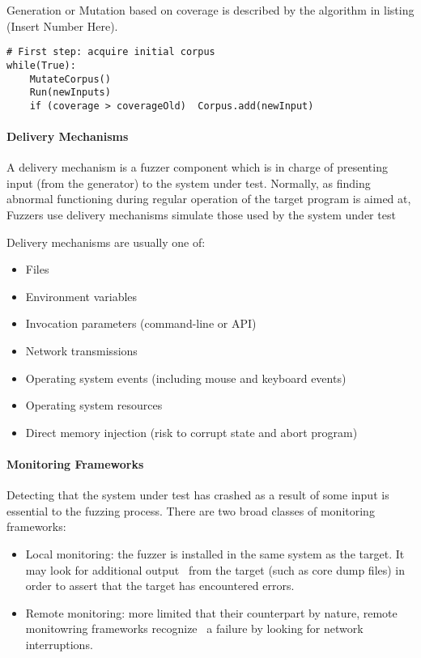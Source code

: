 Generation or Mutation based on coverage is described by the algorithm in listing (Insert Number Here). 

\begin{lstlisting}
# First step: acquire initial corpus
while(True):
    MutateCorpus()
    Run(newInputs)
    if (coverage > coverageOld)  Corpus.add(newInput)
\end{lstlisting}


\paragraph{Delivery Mechanisms}

A delivery mechanism is a fuzzer component which is in charge of presenting input (from the generator) 
to the system under test. Normally, as finding abnormal functioning during regular operation of the
target program is aimed at, Fuzzers use delivery mechanisms simulate those used by the system under test \cite{mcnally12}

Delivery mechanisms are usually one of:

\begin{itemize}
    \item Files
    \item Environment variables
    \item Invocation parameters (command-line or API)
    \item Network transmissions
    \item Operating system events (including mouse and keyboard events)
    \item Operating system resources 
    \item Direct memory injection (risk to corrupt state and abort program)
\end{itemize}


\paragraph{Monitoring Frameworks}

Detecting that the system under test has crashed as a result of some input is essential to the fuzzing process.
There are two broad classes of monitoring frameworks\cite{mcnally12}:

\begin{itemize}
    \item Local monitoring: the fuzzer is installed in the same system as the target. It may look for additional output \
    from the target (such as core dump files) in order to assert that the target has encountered errors.
    \item Remote monitoring: more limited that their counterpart by nature, remote monitowring frameworks recognize \
    a failure by looking for network interruptions.
\end{itemize}

